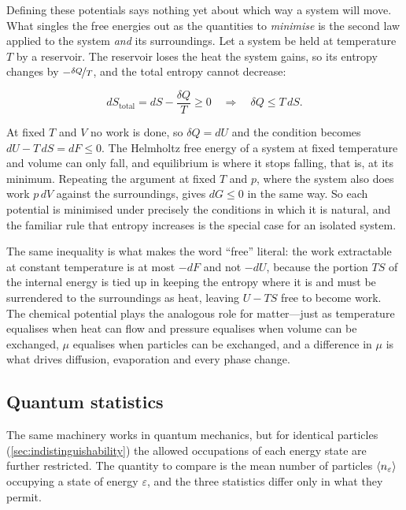        Defining these potentials says nothing yet about which way a system will move. What singles the free energies out as the quantities to \emph{minimise} is the second law applied to the system \emph{and} its surroundings. Let a system be held at temperature $T$ by a reservoir. The reservoir loses the heat the system gains, so its entropy changes by $-\nicefrac{\delta Q}{T}$, and the total entropy cannot decrease:

        \begin{equation*}
            dS_{\text{total}} = dS - \frac{\delta Q}{T} \geq 0 \quad \Longrightarrow \quad \delta Q \leq T\,dS .
        \end{equation*}

        At fixed $T$ and $V$ no work is done, so $\delta Q = dU$ and the condition becomes $dU - T\,dS = dF \leq 0$. The Helmholtz free energy of a system at fixed temperature and volume can only fall, and equilibrium is where it stops falling, that is, at its minimum. Repeating the argument at fixed $T$ and $p$, where the system also does work $p\,dV$ against the surroundings, gives $dG \leq 0$ in the same way. So each potential is minimised under precisely the conditions in which it is natural, and the familiar rule that entropy increases is the special case for an isolated system.

        The same inequality is what makes the word \enquote{free} literal: the work extractable at constant temperature is at most $-dF$ and not $-dU$, because the portion $TS$ of the internal energy is tied up in keeping the entropy where it is and must be surrendered to the surroundings as heat, leaving $U-TS$ free to become work. The chemical potential plays the analogous role for matter---just as temperature equalises when heat can flow and pressure equalises when volume can be exchanged, $\mu$ equalises when particles can be exchanged, and a difference in $\mu$ is what drives diffusion, evaporation and every phase change.

    \subsection{Quantum statistics}\label{subsec:quantum-statistics}

        The same machinery works in quantum mechanics, but for identical particles (\cref{sec:indistinguishability}) the allowed occupations of each energy state are further restricted. The quantity to compare is the mean number of particles $\langle n_\varepsilon \rangle$ occupying a state of energy $\varepsilon$, and the three statistics differ only in what they permit.

